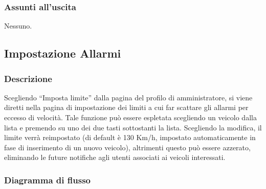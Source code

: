 \documentclass[a4paper,12pt]{article}
\begin{document}
\subsubsection{Assunti all'uscita}
Nessuno.

\pagebreak

\subsection{Impostazione Allarmi}
\subsubsection{Descrizione}
Scegliendo ``Imposta limite'' dalla pagina del profilo di amministratore, si viene diretti nella pagina di impostazione dei limiti a cui far scattare gli allarmi per eccesso di velocità. Tale funzione può essere espletata scegliendo un veicolo dalla lista e premendo su uno dei due tasti sottostanti la lista. Scegliendo la modifica, il limite verrà reimpostato (di default è 130 Km/h, impostato automaticamente in fase di inserimento di un nuovo veicolo), altrimenti questo può essere azzerato, eliminando le future notifiche agli utenti associati ai veicoli interessati.


\subsubsection{Diagramma di flusso}
\end{document}
